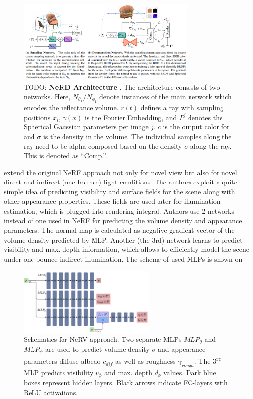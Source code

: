 \documentclass[english]{article}
\begin{document}
\begin{figure}[t]
    \centering
    \includegraphics[width=0.78\textwidth]{img/mlp_nerd.png}
    \caption{TODO: \textbf{NeRD Architecture} \cite{boss2020nerd}. The architecture consists of two networks. Here, $N_{\theta_1}/N_{\phi_1}$ denote instances of the main network which encodes the reflectance volume. $r(t)$ defines a ray with sampling positions $x_i$, $\gamma(x)$ is the Fourier Embedding, and $\Gamma^j$ denotes the Spherical Gaussian parameters per image $j$. $c$ is the output color for and $\sigma$ is the density in the volume.
    The individual samples along the ray need to be alpha composed based on the density $\sigma$ along the ray.
    This is denoted as ``Comp.''.}
    \label{fig:mlp_nerd}
\end{figure}

\cite{srinivasan2020nerv} extend the original NeRF approach not only for novel view but also for novel direct and indirect (one bounce) light conditions. The authors exploit a quite simple idea of predicting visibility and surface fields for the scene along with other appearance properties. These fields are used later for illumination estimation, which is plugged into rendering integral. Authors use 2 networks instead of one used in NeRF for predicting the volume density and appearance parameters. The normal map is calculated as negative gradient vector of the volume density predicted by MLP. Another (the 3rd) network learns to predict visibility and max. depth information, which allows to efficiently model the scene under one-bounce indirect illumination. The scheme of used MLPs is shown on 

\begin{figure}[t]
    \centering
    \includegraphics[width=0.6\textwidth]{img/mlp_nerv.png}
    \caption{Schematics for NeRV \cite{srinivasan2020nerv} approach. Two separate MLPs $MLP_\theta$ and $MLP_\psi$ are used to predict volume density $\sigma$ and appearance parameters diffuse albedo $c_{dif}$ as well as roughness $\gamma_{rough}$. The 3\textsuperscript{rd} MLP predicts visibility $v_\phi$ and max. depth $d_\phi$ values. Dark blue boxes represent hidden layers. Black arrows indicate FC-layers with ReLU activations.}
    \label{fig:mlp_nerv}
\end{figure}
\end{document}
